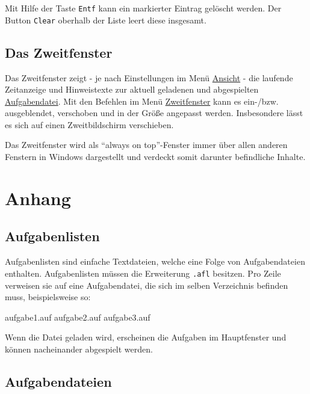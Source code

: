 \documentclass[a4paper,DIV=11
]{scrartcl}
\newcommand{\computer}[1]{\texttt{#1}}
\newenvironment{Shaded}{}{}
\newcommand{\NormalTok}[1]{#1}
\begin{document}
Mit Hilfe der Taste \texttt{Entf} kann ein markierter Eintrag gelöscht
werden. Der Button \texttt{Clear} oberhalb der Liste leert diese
insgesamt.

\hypertarget{das-zweitfenster}{%
\subsection{Das Zweitfenster}\label{das-zweitfenster}}

Das Zweitfenster zeigt - je nach Einstellungen im Menü
\protect\hyperlink{BefehleImMenuAnsicht}{Ansicht} - die laufende
Zeitanzeige und Hinweistexte zur aktuell geladenen und abgespielten
\protect\hyperlink{Aufgabendatei}{Aufgabendatei}. Mit den Befehlen im
Menü \protect\hyperlink{BefehleImMenuZweitfenster}{Zweitfenster} kann es
ein-/bzw. ausgeblendet, verschoben und in der Größe angepasst werden.
Insbesondere lässt es sich auf einen Zweitbildschirm verschieben.

Das Zweitfenster wird als "`always on top"'-Fenster immer über allen
anderen Fenstern in Windows dargestellt und verdeckt somit darunter
befindliche Inhalte.

\hypertarget{anhang}{%
\section{Anhang}\label{anhang}}

\hypertarget{aufgabenlisten}{%
\subsection{Aufgabenlisten}\label{aufgabenlisten}}

Aufgabenlisten sind einfache Textdateien, welche eine Folge von
Aufgabendateien enthalten. Aufgabenlisten müssen die Erweiterung \computer{.afl}
besitzen. Pro Zeile verweisen sie auf eine Aufgabendatei, die sich im
selben Verzeichnis befinden muss, beispielsweise so:

\begin{Shaded}
\begin{Highlighting}[]
\NormalTok{aufgabe1.auf}
\NormalTok{aufgabe2.auf}
\NormalTok{aufgabe3.auf}
\end{Highlighting}
\end{Shaded}

Wenn die Datei geladen wird, erscheinen die Aufgaben im Hauptfenster und
können nacheinander abgespielt werden.

\hypertarget{aufgabendateien}{%
\subsection{Aufgabendateien}\label{aufgabendateien}}
\end{document}
